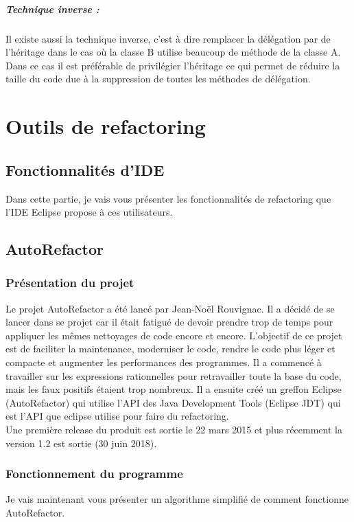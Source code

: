 \documentclass[a4paper,twoside,12pt,openright]{report}
\begin{document}
\paragraph{Technique inverse :}
Il existe aussi la technique inverse, c'est à dire remplacer la délégation par de l'héritage dans le cas où la classe B utilise beaucoup de méthode de la classe A.
Dans ce cas il est préférable de privilégier l'héritage ce qui permet de réduire la taille du code due à la suppression de toutes les méthodes de délégation.\\

\chapter{Outils de refactoring}
\section{Fonctionnalités d'IDE}
Dans cette partie, je vais vous présenter les fonctionnalités de refactoring que l'IDE Eclipse propose à ces utilisateurs.


\section{AutoRefactor}
\subsection{Présentation du projet}
Le projet AutoRefactor a été lancé par Jean-Noël Rouvignac. Il a décidé de se lancer dans se projet car il était fatigué de devoir prendre trop de temps pour appliquer les mêmes nettoyages de code encore et encore. L'objectif de ce projet est de faciliter la maintenance, moderniser le code, rendre le code plus léger et compacte et augmenter les performances des programmes. Il a commencé à travailler sur les expressions rationnelles pour retravailler toute la base du code, mais les faux positifs étaient trop nombreux.\cite{ref7} Il a ensuite créé un greffon Eclipse (AutoRefactor) qui utilise  l'API des Java Development Tools (Eclipse JDT) qui est l'API que eclipse utilise pour faire du refactoring.\\
Une première release du produit est sortie le 22 mars 2015 et plus récemment la version 1.2 est sortie (30 juin 2018).

\subsection{Fonctionnement du programme}
Je vais maintenant vous présenter un algorithme simplifié de comment fonctionne AutoRefactor.
\end{document}
